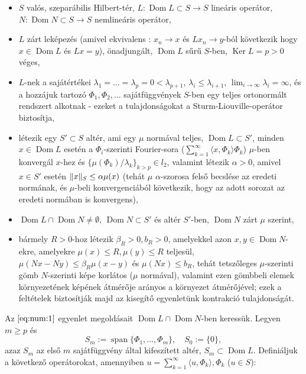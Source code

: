 \documentclass[oneside, titlepage, 12pt, a4paper]{report}
\DeclareMathOperator{\Ker}{Ker}	%
\DeclareMathOperator{\Dom}{Dom}	%
\DeclareMathOperator{\Span}{span}	%
\DeclarePairedDelimiter\norm{\lVert}{\rVert}	%
\begin{document}
\begin{itemize}
\item $S$ valós, szeparábilis Hilbert-tér, $L : \Dom L \subset S \rightarrow S$ lineáris operátor, $N : \Dom N \subset S \rightarrow S$ nemlineáris operátor,
\item $L$ zárt leképezés (amivel ekvivalens \cite{funkanal}: $x_n \rightarrow x$ és $Lx_n \rightarrow y$-ból következik hogy $x \in \Dom L$ és $Lx = y$), önadjungált, $\Dom L$ sűrű $S$-ben, $\Ker L = p > 0$ véges,
\item $L$-nek a sajátértékei $\lambda_1 = \dots = \lambda_p = 0 < \lambda_{p + 1}$, $\lambda_i \leq \lambda_{i + 1}$, $\lim_{i \to \infty} \lambda_i = \infty$, és a hozzájuk tartozó $\Phi_1, \Phi_2, \dots$ sajátfüggvények $S$-ben egy teljes ortonormált rendszert alkotnak - ezeket a tulajdonságokat a Sturm-Liouville-operátor biztosítja,
\item létezik egy $S' \subset S$ altér, ami egy $\mu$ normával teljes, $\Dom L \subset S'$, minden $x \in \Dom L$ esetén a $\Phi_i$-szerinti Fourier-sora ($\sum_{k=1}^\infty \langle x, \Phi_k \rangle \Phi_k$) $\mu$-ben konvergál $x$-hez és $\{ \mu(\Phi_k) / \lambda_k\}_{k > p} \in l_2$, valamint létezik $\alpha > 0$, amivel $x \in S'$ esetén $\norm {x}_S \leq \alpha \mu(x)$ (tehát $\mu$ $\alpha$-szorosa felső becslése az eredeti normának, és $\mu$-beli konvergenciából következik, hogy az adott sorozat az eredeti normában is konvergens),
\item $\Dom L \cap \Dom N \neq \emptyset$, $\Dom N \subset S'$ és altér $S'$-ben, $\Dom N$ zárt $\mu$ szerint,
\item bármely $R > 0$-hoz létezik $\beta_R > 0, b_R > 0$, amelyekkel azon $x, y \in \Dom N$-ekre, amelyekre $\mu(x) \leq R, \mu(y) \leq R$ teljesül, $\mu(Nx - Ny) \leq \beta_R \mu(x - y)$ és $\mu(Nx) \leq b_R$, tehát tetszőleges $\mu$-szerinti gömb $N$-szerinti képe korlátos ($\mu$ normával), valamint ezen gömbbeli elemek környezetének képének átmérője arányos a környezet átmérőjével; ezek a feltételek biztosítják majd az kisegítő egyenletünk kontrakció tulajdonságát. %
\end{itemize}
Az $\eqref{eq:num:1}$ egyenlet megoldásait $\Dom L \cap \Dom N$-ben keressük. Legyen $m \geq p$ és
\begin{equation*}
S_m := \Span \{\Phi_1, \dots, \Phi_m \}, \quad S_0 := \{ 0\},
\end{equation*}
azaz $S_m$ az első $m$ sajátfüggvény által kifeszített altér, $S_m \subset \Dom L$. Definiáljuk a következő operátorokat, amennyiben $u = \sum_{k = 1}^\infty \langle u, \Phi_k \rangle, \Phi_k$ ($u \in S$):
\end{document}
